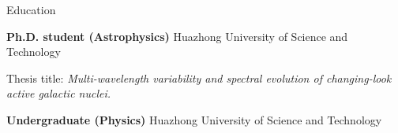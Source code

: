 \begin{rubric}{Education}

\entry*[2016-09 to 2022-06]%
	\textbf{Ph.D. student (Astrophysics)} Huazhong University of Science and Technology
    \par Thesis title: \emph{Multi-wavelength variability and spectral evolution of changing-look active galactic nuclei.}

%
\entry*[2012-09 to 2016-06]%
	\textbf{Undergraduate (Physics)} Huazhong University of Science and Technology \par
\end{rubric}


